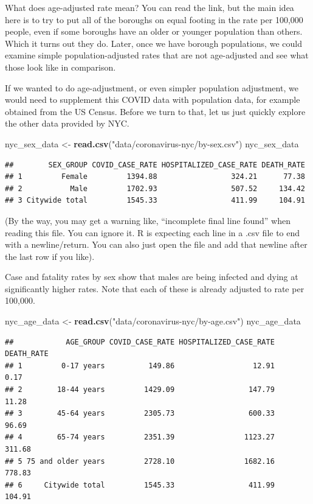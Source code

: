 \documentclass[openany]{book}
\newenvironment{Shaded}{\begin{snugshade}}{\end{snugshade}}
\newcommand{\KeywordTok}[1]{\textcolor[rgb]{0.13,0.29,0.53}{\textbf{#1}}}
\newcommand{\NormalTok}[1]{#1}
\newcommand{\StringTok}[1]{\textcolor[rgb]{0.31,0.60,0.02}{#1}}
\begin{document}
What does age-adjusted rate mean? You can read the link, but the main idea here is to try to put all of the boroughs on equal footing in the rate per 100,000 people, even if some boroughs have an older or younger population than others. Which it turns out they do. Later, once we have borough populations, we could examine simple population-adjusted rates that are not age-adjusted and see what those look like in comparison.

If we wanted to do age-adjustment, or even simpler population adjustment, we would need to supplement this COVID data with population data, for example obtained from the US Census. Before we turn to that, let us just quickly explore the other data provided by NYC.

\begin{Shaded}
\begin{Highlighting}[]
\NormalTok{nyc_sex_data <-}\StringTok{ }\KeywordTok{read.csv}\NormalTok{(}\StringTok{"data/coronavirus-nyc/by-sex.csv"}\NormalTok{)}
\NormalTok{nyc_sex_data}
\end{Highlighting}
\end{Shaded}

\begin{verbatim}
##        SEX_GROUP COVID_CASE_RATE HOSPITALIZED_CASE_RATE DEATH_RATE
## 1         Female         1394.88                 324.21      77.38
## 2           Male         1702.93                 507.52     134.42
## 3 Citywide total         1545.33                 411.99     104.91
\end{verbatim}

(By the way, you may get a warning like, ``incomplete final line found'' when reading this file. You can ignore it. R is expecting each line in a .csv file to end with a newline/return. You can also just open the file and add that newline after the last row if you like).

Case and fatality rates by sex show that males are being infected and dying at significantly higher rates. Note that each of these is already adjusted to rate per 100,000.

\begin{Shaded}
\begin{Highlighting}[]
\NormalTok{nyc_age_data <-}\StringTok{ }\KeywordTok{read.csv}\NormalTok{(}\StringTok{"data/coronavirus-nyc/by-age.csv"}\NormalTok{)}
\NormalTok{nyc_age_data}
\end{Highlighting}
\end{Shaded}

\begin{verbatim}
##            AGE_GROUP COVID_CASE_RATE HOSPITALIZED_CASE_RATE DEATH_RATE
## 1         0-17 years          149.86                  12.91       0.17
## 2        18-44 years         1429.09                 147.79      11.28
## 3        45-64 years         2305.73                 600.33      96.69
## 4        65-74 years         2351.39                1123.27     311.68
## 5 75 and older years         2728.10                1682.16     778.83
## 6     Citywide total         1545.33                 411.99     104.91
\end{verbatim}
\end{document}

